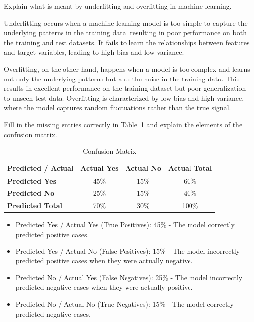 \documentclass[12pt]{article}
\begin{document}
    \begin{ejercicio}
        Explain what is meant by underfitting and overfitting in machine learning.

        Underfitting occurs when a machine learning model is too simple to capture the underlying patterns in the training data, resulting in poor performance on both the training and test datasets. It fails to learn the relationships between features and target variables, leading to high bias and low variance.

        Overfitting, on the other hand, happens when a model is too complex and learns not only the underlying patterns but also the noise in the training data. This results in excellent performance on the training dataset but poor generalization to unseen test data. Overfitting is characterized by low bias and high variance, where the model captures random fluctuations rather than the true signal.
    \end{ejercicio}

    \begin{ejercicio}
        Fill in the missing entries correctly in Table~\ref{tab:confusion_matrix2} and explain the elements of the confusion matrix.

        \begin{table}[h!]
        \centering
        \begin{tabular}{|l|c|c|c|}
        \hline
        \textbf{Predicted / Actual} & \textbf{Actual Yes} & \textbf{Actual No} & \textbf{Actual Total} \\ \hline
        \textbf{Predicted Yes} & 45\% & 15\% & 60\%\\ \hline
        \textbf{Predicted No} & 25\%& 15\% & 40\% \\ \hline
        \textbf{Predicted Total} & 70\% & 30\% & 100\% \\ \hline
        \end{tabular}
        \caption{Confusion Matrix}
        \label{tab:confusion_matrix2}
        \end{table}

        \begin{itemize}
            \item Predicted Yes / Actual Yes (True Positives): 45\% - The model correctly predicted positive cases.
            \item Predicted Yes / Actual No (False Positives): 15\% - The model incorrectly predicted positive cases when they were actually negative.
            \item Predicted No / Actual Yes (False Negatives): 25\% - The model incorrectly predicted negative cases when they were actually positive.
            \item Predicted No / Actual No (True Negatives): 15\% - The model correctly predicted negative cases.
        \end{itemize}
    \end{ejercicio}
\end{document}
